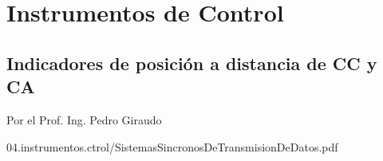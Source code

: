 %


\chapter{Instrumentos de Control}
\label{chap:U04.instrumentos.ctrol}





\section{Indicadores de posición a distancia de CC y CA}
\label{sec:U04.02.indicadores.posicion.a.distancia.cc.ca}

\begin{flushright}
  Por el Prof. Ing. Pedro Giraudo
\end{flushright}



  
{04.instrumentos.ctrol/SistemasSincronosDeTransmisionDeDatos.pdf}




